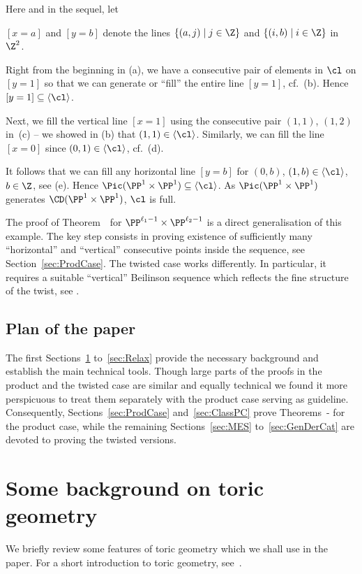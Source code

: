 Here and in the sequel, let 
\begin{center}
{$[x=a]$ and $[y=b]$ denote the lines $\{(a,j)\mid j\in\Z\}$ 
and $\{(i,b)\mid i\in\Z\}$ in $\Z^2$.}
\end{center}
{Right from the beginning in (a), we} have a 
consecutive pair of elements in $\cl$ on $[y=1]$ 
so that we can generate or ``fill'' the entire 
line $[y=1]$, cf.\ (b). Hence $[y=1]\subseteq\langle
\cl\rangle$.

Next, we fill the vertical line $[x=1]$ 
using the consecutive pair $(1,1)$, $(1,2)$ in~(c) -- we showed in (b) that $(1,1)\in
\langle\cl\rangle$. Similarly, we can fill 
the line $[x=0]$ since $(0,1)\in\langle\cl\rangle$, 
cf.\ (d).

It follows that we can fill any horizontal 
line $[y=b]$ for $(0,b)$, $(1,b)\in\langle\cl\rangle$, 
$b\in\Z$, see (e). Hence $\Pic(\PP^1\times\PP^1)
\subseteq\langle\cl\rangle$. As 
$\Pic(\PP^1\times\PP^1)$ generates 
$\CD(\PP^1\times\PP^1)$, $\cl$ is full. 

The proof of Theorem~\thFull\ for 
$\PP^{\ell_1-1}\times\PP^{\ell_2-1}$ is a direct 
generalisation of this example. The key step 
consists in proving existence of sufficiently many 
``horizontal'' and ``vertical'' consecutive points 
inside the sequence, see Section~\ref{sec:ProdCase}. 
The twisted case works differently.
In particular, it requires a suitable ``vertical'' 
Beilinson sequence which reflects the fine structure 
of the twist, see . 

\subsection{Plan of the paper}
\label{subsec:PlanPaper}
The first Sections~\ref{sec:TorGeo} to~\ref{sec:Relax} 
provide the 
necessary background and establish the {main} technical 
tools. 
{Though large parts of the proofs in the product 
and the twisted case are similar and equally technical}
we found it more perspicuous to 
treat them separately with the product case serving as 
guideline. {Consequently, Sections~\ref{sec:ProdCase}
and~\ref{sec:ClassPC} prove Theorems~{\thLex}-{\thFull} 
for the product case, while 
the remaining Sections~\ref{sec:MES} to~\ref{sec:GenDerCat} 
are devoted to proving the twisted versions.}

\section{Some background on toric geometry}
\label{sec:TorGeo}
We briefly review some features of toric 
geometry which we shall use in the paper.
For a short introduction to toric geometry, 
see~\cite{fultonToric}.

